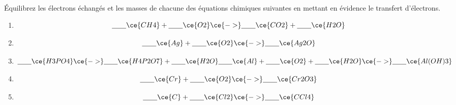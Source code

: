 \documentclass[
  11pt,
  a4paper,
  openany]{book}
\providecommand{\tightlist}{%
  \setlength{\itemsep}{0pt}\setlength{\parskip}{0pt}}
\begin{document}
\begin{Exercise}

Équilibrez les électrons échangés et les masses de chacune des équations chimiques suivantes en mettant en évidence le transfert d'électrons.

\begin{enumerate}
\def\labelenumi{\alph{enumi}.}
\tightlist
\item
  \[
  \underline{\hspace{2em}} \ce{CH4} + \underline{\hspace{2em}} \ce{O2} \ce{->} \underline{\hspace{2em}} \ce{CO2} + \underline{\hspace{2em}} \ce{H2O}
  \]
  \vspace{1em}
\item
  \[
  \underline{\hspace{2em}} \ce{Ag} + \underline{\hspace{2em}} \ce{O2} \ce{->} \underline{\hspace{2em}} \ce{Ag2O}
  \]
  \vspace{1em}
\item
  \[
  \underline{\hspace{2em}} \ce{H3PO4} \ce{->} \underline{\hspace{2em}} \ce{H4P2O7} + \underline{\hspace{2em}} \ce{H2O}
  \underline{\hspace{2em}} \ce{Al} + \underline{\hspace{2em}} \ce{O2} + \underline{\hspace{2em}} \ce{H2O} \ce{->} \underline{\hspace{2em}} \ce{Al(OH)3}
  \]
  \vspace{1em}
\item
  \[
  \underline{\hspace{2em}} \ce{Cr} + \underline{\hspace{2em}} \ce{O2} \ce{->} \underline{\hspace{2em}} \ce{Cr2O3}
  \]
  \vspace{1em}
\item
  \[
  \underline{\hspace{2em}} \ce{C} + \underline{\hspace{2em}} \ce{Cl2} \ce{->} \underline{\hspace{2em}} \ce{CCl4}
  \]
  \vspace{1em}
\end{enumerate}

\end{Exercise}
\end{document}
